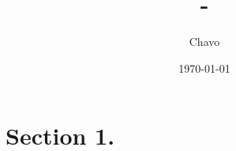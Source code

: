 \documentclass[12pt,twoside]{article}
\title{\course-\assignment}
\author{Chavo}
\date{\today}
\begin{document}
\nocite{*}
\maketitle

\section{Section 1.}
\lipsum[5]

\newpage


\end{document}
